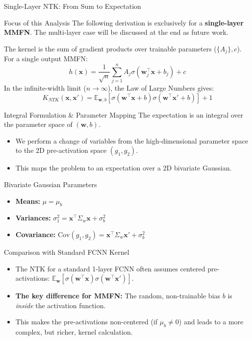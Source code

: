\documentclass{beamer}
\begin{document}
\begin{frame}{Single-Layer NTK: From Sum to Expectation}
\begin{alertblock}{Focus of this Analysis}
The following derivation is exclusively for a \textbf{single-layer MMFN}. The multi-layer case will be discussed at the end as future work.
\end{alertblock}
The kernel is the sum of gradient products over trainable parameters ($\{A_j\}, c$). For a single output MMFN:
\begin{equation*}
    h(\bm{x}) = \frac{1}{\sqrt{n}} \sum_{j=1}^n A_j \sigma(\bm{w}_j^\top \bm{x} + b_j) + c
\end{equation*}
In the infinite-width limit ($n \to \infty$), the Law of Large Numbers gives:
\begin{equation}
    K_{NTK}(\bm{x}, \bm{x}') = \mathbb{E}_{\bm{w},b} \left[ \sigma(\bm{w}^\top \bm{x} + b)\sigma(\bm{w}^\top \bm{x}' + b) \right] + 1
\end{equation}
\end{frame}

\begin{frame}{Integral Formulation \& Parameter Mapping}
The expectation is an integral over the parameter space of $(\bm{w}, b)$.
\begin{itemize}
    \item We perform a change of variables from the high-dimensional parameter space to the 2D pre-activation space $(g_1, g_2)$.
    \item This maps the problem to an expectation over a 2D bivariate Gaussian.
\end{itemize}
\begin{block}{Bivariate Gaussian Parameters}
\begin{itemize}
    \item \textbf{Means:} $\mu = \mu_b$
    \item \textbf{Variances:} $\sigma_1^2 = \bm{x}^\top \Sigma_w \bm{x} + \sigma_b^2$
    \item \textbf{Covariance:} $\text{Cov}(g_1, g_2) = \bm{x}^\top \Sigma_w \bm{x}' + \sigma_b^2$
\end{itemize}
\end{block}
\end{frame}

\begin{frame}{Comparison with Standard FCNN Kernel}
\begin{itemize}
    \item The NTK for a standard 1-layer FCNN often assumes centered pre-activations: $\mathbb{E}_{\bm{w}}[\sigma(\bm{w}^\top\bm{x})\sigma(\bm{w}^\top\bm{x}')]$.
    \item \textbf{The key difference for MMFN:} The random, non-trainable bias $b$ is \textit{inside} the activation function.
    \item This makes the pre-activations non-centered (if $\mu_b \neq 0$) and leads to a more complex, but richer, kernel calculation.
\end{itemize}
\end{frame}
\end{document}
